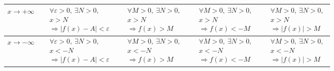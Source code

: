 \documentclass[../book.tex]{subfiles}
\begin{document}
\begin{enumerate}
\begin{tabular}{|c|p{3.2cm}|p{3.2cm}|p{3.2cm}|p{3.2cm}|}
            $x\to +\infty$
            & $\begin{aligned}
                   &\forall\varepsilon>0,\ \exists N>0,\\
                   &x>N\\
                   &\Rightarrow |f(x)-A|<\varepsilon
            \end{aligned}$
            & $\begin{aligned}
                   &\forall M>0,\ \exists N>0,\\
                   &x>N\\
                   &\Rightarrow f(x)>M
            \end{aligned}$
            & $\begin{aligned}
                   &\forall M>0,\ \exists N>0,\\
                   &x>N\\
                   &\Rightarrow f(x)<-M
            \end{aligned}$
            & $\begin{aligned}
                   &\forall M>0,\ \exists N>0,\\
                   &x>N\\
                   &\Rightarrow |f(x)|>M
            \end{aligned}$
            \\ \hline

            $x\to -\infty$
            & $\begin{aligned}
                   &\forall\varepsilon>0,\ \exists N>0,\\
                   &x<-N\\
                   &\Rightarrow |f(x)-A|<\varepsilon
            \end{aligned}$
            & $\begin{aligned}
                   &\forall M>0,\ \exists N>0,\\
                   &x<-N\\
                   &\Rightarrow f(x)>M
            \end{aligned}$
            & $\begin{aligned}
                   &\forall M>0,\ \exists N>0,\\
                   &x<-N\\
                   &\Rightarrow f(x)<-M
            \end{aligned}$
            & $\begin{aligned}
                   &\forall M>0,\ \exists N>0,\\
                   &x<-N\\
                   &\Rightarrow |f(x)|>M
            \end{aligned}$
            \\ \hline


\end{tabular}
\end{enumerate}
\end{document}
